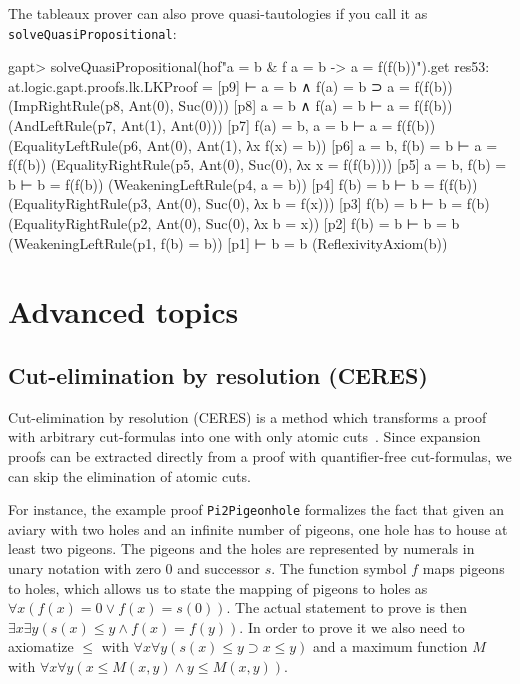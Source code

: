 \documentclass[a4paper,11pt]{book}
\newcommand{\impl}{\supset} %
\renewcommand{\land}{\wedge}
\renewcommand{\lor}{\vee}
\begin{document}
The tableaux prover can also prove quasi-tautologies if you call it as \texttt{solveQuasiPropositional}:
\begin{clilisting}
gapt> solveQuasiPropositional(hof"a = b & f a = b -> a = f(f(b))").get
res53: at.logic.gapt.proofs.lk.LKProof =
[p9]  ⊢ a = b ∧ f(a) = b ⊃ a = f(f(b))    (ImpRightRule(p8, Ant(0), Suc(0)))
[p8] a = b ∧ f(a) = b ⊢ a = f(f(b))    (AndLeftRule(p7, Ant(1), Ant(0)))
[p7] f(a) = b, a = b ⊢ a = f(f(b))    (EqualityLeftRule(p6, Ant(0), Ant(1), λx f(x) = b))
[p6] a = b, f(b) = b ⊢ a = f(f(b))    (EqualityRightRule(p5, Ant(0), Suc(0), λx x = f(f(b))))
[p5] a = b, f(b) = b ⊢ b = f(f(b))    (WeakeningLeftRule(p4, a = b))
[p4] f(b) = b ⊢ b = f(f(b))    (EqualityRightRule(p3, Ant(0), Suc(0), λx b = f(x)))
[p3] f(b) = b ⊢ b = f(b)    (EqualityRightRule(p2, Ant(0), Suc(0), λx b = x))
[p2] f(b) = b ⊢ b = b    (WeakeningLeftRule(p1, f(b) = b))
[p1]  ⊢ b = b    (ReflexivityAxiom(b))

\end{clilisting}


\chapter{Advanced topics}


\section{Cut-elimination by resolution (CERES)}\label{sec:ceres}

Cut-elimination by resolution (CERES) is a method which transforms a
proof with arbitrary cut-formulas into one with only atomic cuts~\cite{Baaz00CutElimination,Baaz2011}. Since
expansion proofs can be extracted directly from a proof with quantifier-free
cut-formulas, we can skip the elimination of atomic cuts.

For instance, the example proof \texttt{Pi2Pigeonhole} formalizes
the fact that given an aviary with two holes and an infinite number
of pigeons, one hole has to house at least two pigeons. The pigeons and
the holes are represented by numerals in unary notation with zero $0$ and
successor $s$. The function symbol $f$ maps pigeons to holes, which allows us
to state the mapping of pigeons to holes as
$\forall x (f(x) = 0 \lor f(x) = s(0))$. The actual statement to prove is then
$\exists x \exists y (s(x) \leq y \land f(x) = f(y))$. In order to prove it
we also need to axiomatize $\leq$ with
$\forall x \forall y (s(x) \leq y \impl x \leq y)$ 
and a maximum function $M$ with $\forall x \forall y (x \leq M(x,y) \land y\leq M(x,y))$.
\end{document}
